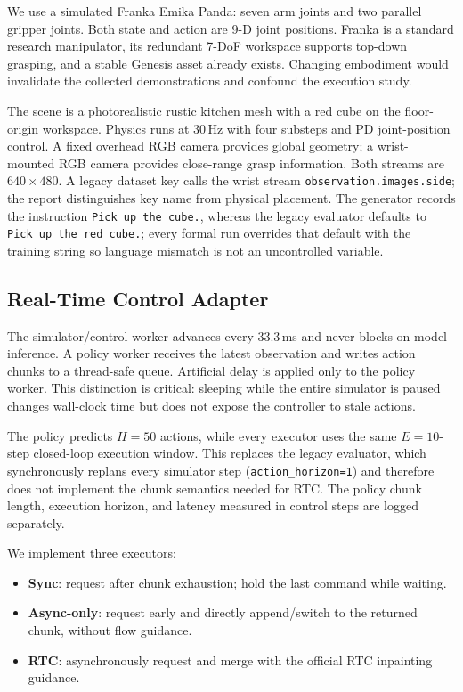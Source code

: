 \documentclass[10pt,twocolumn]{article}
\begin{document}
We use a simulated Franka Emika Panda: seven arm joints and two parallel
gripper joints.  Both state and action are 9-D joint positions.  Franka is a
standard research manipulator, its redundant 7-DoF workspace supports
top-down grasping, and a stable Genesis asset already exists.  Changing
embodiment would invalidate the collected demonstrations and confound the
execution study.

The scene is a photorealistic rustic kitchen mesh with a red cube on the
floor-origin workspace.  Physics runs at 30\,Hz with four substeps and PD
joint-position control.  A fixed overhead RGB camera provides global geometry;
a wrist-mounted RGB camera provides close-range grasp information.  Both
streams are $640\times480$.  A legacy dataset key calls the wrist stream
\texttt{observation.images.side}; the report distinguishes key name from
physical placement.  The generator records the instruction
\texttt{Pick up the cube.}, whereas the legacy evaluator defaults to
\texttt{Pick up the red cube.}; every formal run overrides that default with
the training string so language mismatch is not an uncontrolled variable.

\subsection{Real-Time Control Adapter}

The simulator/control worker advances every 33.3\,ms and never blocks on model
inference.  A policy worker receives the latest observation and writes action
chunks to a thread-safe queue.  Artificial delay is applied only to the policy
worker.  This distinction is critical: sleeping while the entire simulator is
paused changes wall-clock time but does not expose the controller to stale
actions.

The policy predicts $H=50$ actions, while every executor uses the same
$E=10$-step closed-loop execution window.  This replaces the legacy evaluator,
which synchronously replans every simulator step
(\texttt{action\_horizon=1}) and therefore does not implement the chunk
semantics needed for RTC.  The policy chunk length, execution horizon, and
latency measured in control steps are logged separately.

We implement three executors:

\begin{itemize}[leftmargin=*,itemsep=1pt]
  \item \textbf{Sync}: request after chunk exhaustion; hold the last command
        while waiting.
  \item \textbf{Async-only}: request early and directly append/switch to the
        returned chunk, without flow guidance.
  \item \textbf{RTC}: asynchronously request and merge with the official RTC
        inpainting guidance.
\end{itemize}
\end{document}
